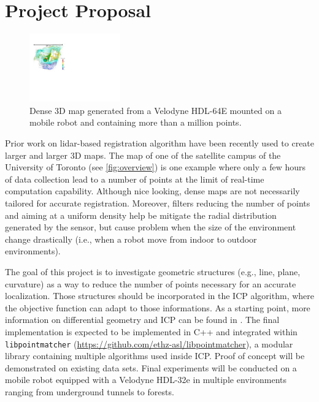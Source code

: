 \documentclass[10pt,letterpaper,oneside]{article}
\author{Fran\c{c}ois Pomerleau \\
       Laval University\\
       1065, av. de la Médecine \\
       Quebec, Qc \\
       Canada G1V 0A6 \\
       \texttt{<francois.pomerleau@ift.ulaval.ca>}
}
\begin{document}
\makeCustomTitle

\section*{Project Proposal}

\begin{figure}
\centering
\includegraphics[width=0.35\textwidth]{./figs/overview.pdf}
\caption{
Dense 3D map generated from a Velodyne HDL-64E mounted on a mobile robot and containing more than a million points.
}
\label{fig:overview}
\end{figure}

Prior work on lidar-based registration algorithm \cite{Pomerleau2014} have been recently used to create larger and larger 3D maps.
The map of one of the satellite campus of the University of Toronto (see \autoref{fig:overview}) is one example where only a few hours of data collection lead to a number of points at the limit of real-time computation capability.
Although nice looking, dense maps are not necessarily tailored for accurate registration.
Moreover, filters reducing the number of points and aiming at a uniform density help be mitigate the radial distribution generated by the sensor, but cause problem when the size of the environment change drastically (i.e., when a robot move from indoor to outdoor environments).

The goal of this project is to investigate geometric structures (e.g., line, plane, curvature) as a way to reduce the number of points necessary for an accurate localization.
Those structures should be incorporated in the \ac{ICP} algorithm, where the objective function can adapt to those informations.
As a starting point, more information on differential geometry and \ac{ICP} can be found in \cite{Pomerleau2015}.
The final implementation is expected to be implemented in C++ and integrated within \texttt{libpointmatcher} (\url{https://github.com/ethz-asl/libpointmatcher}), a modular library containing multiple algorithms used inside \ac{ICP}.
Proof of concept will be demonstrated on existing data sets.
Final experiments will be conducted on a mobile robot equipped with a Velodyne HDL-32e in multiple environments ranging from underground tunnels to forests.
\end{document}
